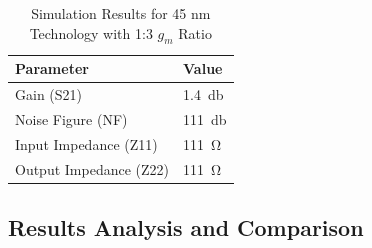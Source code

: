 \begin{table}[H]
    \centering
    \caption{Simulation Results for 45 nm Technology with 1:3 $g_m$ Ratio}
    \begin{tabularx}{\textwidth}{>{\centering\arraybackslash}X >{\centering\arraybackslash}X }
        \toprule
        \textbf{Parameter} & \textbf{Value}\\
        \midrule
        Gain (S21) & \SI{1.4}{\decibel} \\
        \midrule
        Noise Figure (NF) & \SI{111}{\decibel} \\
        \midrule
        Input Impedance (Z11) & \SI{111}{\ohm} \\
        \midrule
        Output Impedance (Z22) & \SI{111}{\ohm} \\
        \bottomrule
    \end{tabularx}
    \label{tab:45nm_1ton_results}
\end{table}


\subsection{Results Analysis and Comparison}